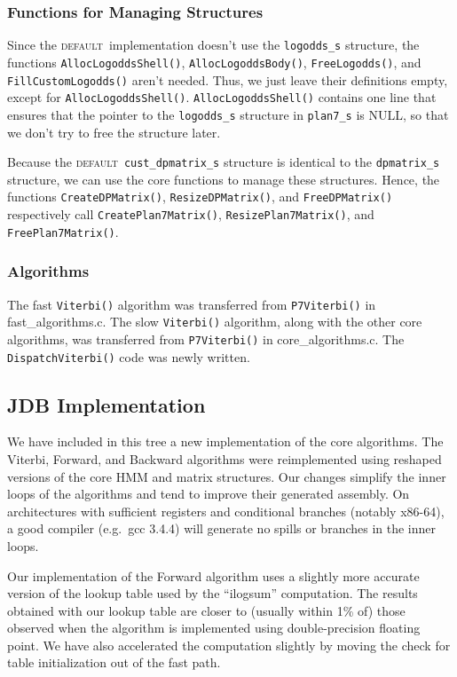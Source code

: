 \documentclass[letterpaper,10pt]{article}
\newcommand{\func}[1]{\texttt{#1()}}
\newcommand{\struct}[1]{\texttt{#1}}
\newcommand{\impl}[1]{\small{\textsc{\textsf{#1}}}}
\newcommand{\deft}{\impl{default}}
\begin{document}
\subsubsection*{Functions for Managing Structures}

Since the \deft\ implementation doesn't use the \struct{logodds\_s}
structure, the functions \func{AllocLogoddsShell}, \linebreak
\func{AllocLogoddsBody}, \func{FreeLogodds}, and
\func{FillCustomLogodds} aren't needed.  Thus, we just leave their
definitions empty, except for \func{AllocLogoddsShell}.
\func{AllocLogoddsShell} contains one line that ensures that the
pointer to the \struct{logodds\_s} structure in \struct{plan7\_s} is
NULL, so that we don't try to free the structure later.

Because the \deft\ \struct{cust\_dpmatrix\_s} structure is identical
to the \struct{dpmatrix\_s} structure, we can use the core functions
to manage these structures.  Hence, the functions
\func{CreateDPMatrix}, \func{ResizeDPMatrix}, and \func{FreeDPMatrix}
respectively call \func{CreatePlan7Matrix}, \func{ResizePlan7Matrix},
and \func{FreePlan7Matrix}.

\subsubsection*{Algorithms}

The fast \func{Viterbi} algorithm was transferred from
\func{P7Viterbi} in fast\_algorithms.c.  The slow \func{Viterbi}
algorithm, along with the other core algorithms, was transferred from
\func{P7Viterbi} in core\_algorithms.c.  The \func{DispatchViterbi}
code was newly written.
 
\subsection*{JDB Implementation}

We have included in this tree a new implementation of the core
algorithms.  The Viterbi, Forward, and Backward algorithms were
reimplemented using reshaped versions of the core HMM and matrix
structures.  Our changes simplify the inner loops of the algorithms
and tend to improve their generated assembly.  On architectures with
sufficient registers and conditional branches (notably x86-64), a good
compiler (e.g.\ gcc 3.4.4) will generate no spills or branches in the
inner loops.

Our implementation of the Forward algorithm uses a slightly more
accurate version of the lookup table used by the ``ilogsum''
computation.  The results obtained with our lookup table are closer to
(usually within 1\% of) those observed when the algorithm is
implemented using double-precision floating point. We have also
accelerated the computation slightly by moving the check for table
initialization out of the fast path.
\end{document}
